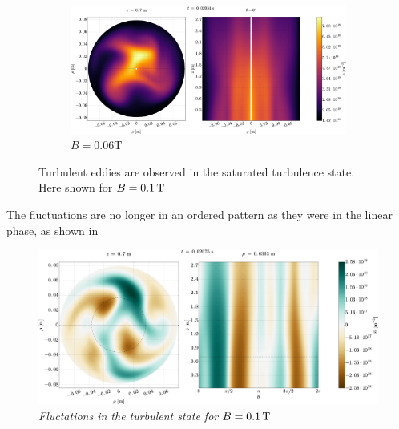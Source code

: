 \begin{figure}[htbp]
\begin{subfigure}[h]{1.00\textwidth}
        \includegraphics[width=1.0\textwidth]{fig/results/2DTurbulence/offCenter}
        \caption{$B=0.06 \text{T}$}
        \label{fig:offcenter}
    \end{subfigure}
    \caption{Turbulent eddies are observed in the saturated turbulence state.
    Here shown for $B=0.1\, \text{T}$}
\end{figure}
%
The fluctuations are no longer in an ordered pattern as they were in the linear phase, as shown in
%
\begin{figure}[htb]
    \centering
    \includegraphics[width=1.0\textwidth]{fig/results/2DTurbulence/fluct}
    \caption{\textit{Fluctations in the turbulent state for $B=0.1\, \text{T}$}}
    \label{fig:divDDZ}
\end{figure}
